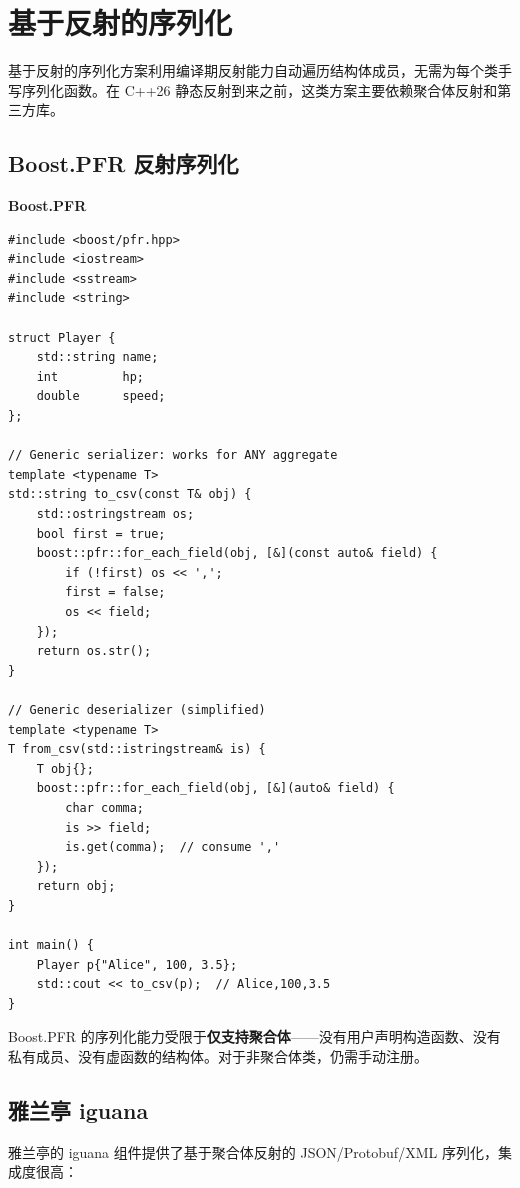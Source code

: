 \documentclass[12pt,a4paper,fontset=fandol]{ctexbook}
\newcommand{\pfrlabel}{%
  \noindent\begin{tcolorbox}[colback=pfrheadbg,coltext=white,
    sharp corners,boxrule=0pt,width=5.6em,height=1.4em,
    halign=center,valign=center,nobeforeafter,left=0pt,right=0pt,
    top=0pt,bottom=0pt]\small\bfseries Boost.PFR\end{tcolorbox}}
\begin{document}
\chapter{基于反射的序列化}\label{ch:reflect-serial}

基于反射的序列化方案利用编译期反射能力自动遍历结构体成员，无需为每个类手写序列化函数。在 C++26 静态反射到来之前，这类方案主要依赖聚合体反射和第三方库。

\section{Boost.PFR 反射序列化}\label{sec:pfr-serial}

\pfrlabel
\begin{lstlisting}[caption={Boost.PFR: 泛型序列化（聚合体自动遍历）}]
#include <boost/pfr.hpp>
#include <iostream>
#include <sstream>
#include <string>

struct Player {
    std::string name;
    int         hp;
    double      speed;
};

// Generic serializer: works for ANY aggregate
template <typename T>
std::string to_csv(const T& obj) {
    std::ostringstream os;
    bool first = true;
    boost::pfr::for_each_field(obj, [&](const auto& field) {
        if (!first) os << ',';
        first = false;
        os << field;
    });
    return os.str();
}

// Generic deserializer (simplified)
template <typename T>
T from_csv(std::istringstream& is) {
    T obj{};
    boost::pfr::for_each_field(obj, [&](auto& field) {
        char comma;
        is >> field;
        is.get(comma);  // consume ','
    });
    return obj;
}

int main() {
    Player p{"Alice", 100, 3.5};
    std::cout << to_csv(p);  // Alice,100,3.5
}
\end{lstlisting}

Boost.PFR 的序列化能力受限于\textbf{仅支持聚合体}——没有用户声明构造函数、没有私有成员、没有虚函数的结构体。对于非聚合体类，仍需手动注册。

\section{雅兰亭 iguana}\label{sec:ylt-serial}

雅兰亭的 iguana 组件提供了基于聚合体反射的 JSON/Protobuf/XML 序列化，集成度很高：
\end{document}
